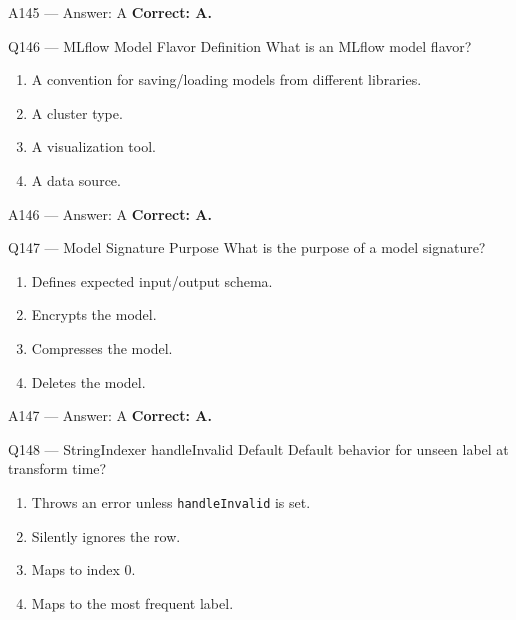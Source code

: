\documentclass[aspectratio=169,9pt]{beamer}
\begin{document}
	\begin{frame}{A145 --- Answer: A}
		\textbf{Correct: A.}
	\end{frame}
	
	\begin{frame}{Q146 --- MLflow Model Flavor Definition}
		What is an MLflow model flavor?
		\begin{enumerate}[label=\Alph*.]
			\item A convention for saving/loading models from different libraries.
			\item A cluster type.
			\item A visualization tool.
			\item A data source.
		\end{enumerate}
	\end{frame}
	
	\begin{frame}{A146 --- Answer: A}
		\textbf{Correct: A.}
	\end{frame}
	
	\begin{frame}{Q147 --- Model Signature Purpose}
		What is the purpose of a model signature?
		\begin{enumerate}[label=\Alph*.]
			\item Defines expected input/output schema.
			\item Encrypts the model.
			\item Compresses the model.
			\item Deletes the model.
		\end{enumerate}
	\end{frame}
	
	\begin{frame}{A147 --- Answer: A}
		\textbf{Correct: A.}
	\end{frame}
	
	\begin{frame}{Q148 --- StringIndexer handleInvalid Default}
		Default behavior for unseen label at transform time?
		\begin{enumerate}[label=\Alph*.]
			\item Throws an error unless \texttt{handleInvalid} is set.
			\item Silently ignores the row.
			\item Maps to index 0.
			\item Maps to the most frequent label.
		\end{enumerate}
	\end{frame}
	
\end{document}

